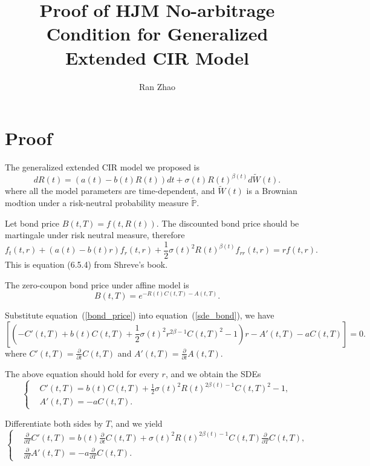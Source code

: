 \documentclass[6pt]{article}
\numberwithin{equation}{section}
\begin{document}
\title{Proof of HJM No-arbitrage Condition for Generalized Extended CIR Model}
\author{Ran Zhao}
\date{}
\maketitle



\section{Proof}
The generalized extended CIR model we proposed is
$$
d R(t) = (a(t) - b(t) R(t)) dt + \sigma(t) R(t)^{\beta(t)} d\tilde{W}(t).
$$
where all the model parameters are time-dependent, and $\tilde{W}(t)$ is a Brownian modtion under a risk-neutral probability measure $\tilde{\mathbb{P}}$.

Let bond price $B(t,T)=f(t,R(t))$. The discounted bond price should be martingale under risk neutral measure, therefore
\begin{equation} \label{sde_bond}
f_t(t,r) + (a(t)-b(t)r) f_r(t,r) + \frac{1}{2}\sigma(t)^2 R(t)^{\beta(t)}f_{rr}(t,r) = r f(t,r).
\end{equation}
This is equation (6.5.4) from Shreve's book.

The zero-coupon bond price under affine model is
\begin{equation} \label{bond_price}
B(t, T) = e^{-R(t)C(t,T) - A(t,T)}.
\end{equation}

Substitute equation~(\ref{bond_price}) into equation~(\ref{sde_bond}), we have
$$
[(-C'(t,T)+b(t)C(t,T) + \frac{1}{2}\sigma(t)^2 r^{2\beta-1}C(t,T)^2-1)r - A'(t,T)-aC(t,T)] = 0.
$$
where $C'(t,T)=\frac{\partial}{\partial t}C(t,T)$ and $A'(t,T)=\frac{\partial}{\partial t}A(t,T)$.

The above equation should hold for every $r$, and we obtain the SDEs
\begin{equation}
\label{CIR}
\left\{\begin{array}{ll}
&C'(t,T) = b(t)C(t,T) + \frac{1}{2}\sigma(t)^2 R(t)^{2\beta(t)-1} C(t,T)^2 - 1,  \\
&A'(t,T) = -a C(t,T).
\end{array}\right.
\end{equation}

Differentiate both sides by $T$, and we yield
\begin{equation}
\label{CIR}
\left\{\begin{array}{ll}
&\frac{\partial}{\partial T}C'(t,T) = b(t) \frac{\partial}{\partial t} C(t,T) + \sigma(t)^2 R(t)^{2\beta(t)-1} C(t,T)\frac{\partial}{\partial T}C(t,T),    \\
&\frac{\partial}{\partial T}A'(t,T) = -a \frac{\partial}{\partial T}C(t,T). 
\end{array}\right.
\end{equation}
\end{document}

